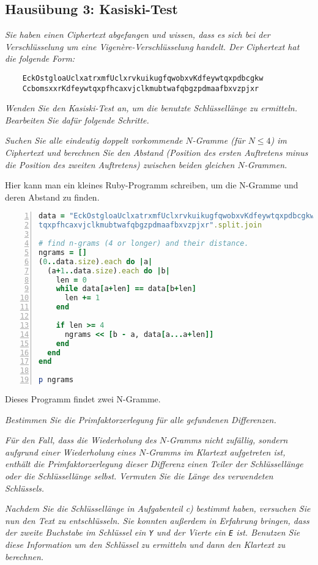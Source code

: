 \documentclass[
  ngerman,
  DIV=12
]{scrartcl}
\begin{document}
\subsection*{Hausübung 3: Kasiski-Test}

\emph{Sie haben einen Ciphertext abgefangen und wissen, dass es sich bei der Verschlüsselung um eine Vigenère-Verschlüsselung handelt. Der Ciphertext hat die folgende Form:}
\begin{verbatim}
    EckOstgloaUclxatrxmfUclxrvkuikugfqwobxvKdfeywtqxpdbcgkw
    CcbomsxxrKdfeywtqxpfhcaxvjclkmubtwafqbgzpdmaafbxvzpjxr
\end{verbatim}
\emph{Wenden Sie den Kasiski-Test an, um die benutzte Schlüssellänge zu ermitteln. Bearbeiten Sie dafür folgende Schritte.}

\medskip\noindent
\emph{Suchen Sie alle eindeutig doppelt vorkommende $N$-Gramme (für $N \leq 4$) im Ciphertext und berechnen Sie den Abstand (Position des ersten Auftretens minus die Position des zweiten Auftretens) zwischen beiden gleichen $N$-Grammen.}

\medskip\noindent
Hier kann man ein kleines Ruby-Programm schreiben, um die N-Gramme und deren Abstand zu finden.
\begin{lstlisting}[language=ruby,numbers=left]
data = "EckOstgloaUclxatrxmfUclxrvkuikugfqwobxvKdfeywtqxpdbcgkwCcbomsxxrKdfeyw
tqxpfhcaxvjclkmubtwafqbgzpdmaafbxvzpjxr".split.join

# find n-grams (4 or longer) and their distance. 
ngrams = []
(0..data.size).each do |a|
  (a+1..data.size).each do |b|
    len = 0
    while data[a+len] == data[b+len]
      len += 1
    end

    if len >= 4
      ngrams << [b - a, data[a...a+len]]
    end
  end
end

p ngrams  
\end{lstlisting}
Dieses Programm findet zwei N-Gramme.

\bigskip\noindent
\emph{Bestimmen Sie die Primfaktorzerlegung für alle gefundenen Differenzen.}

\bigskip\noindent
\emph{Für den Fall, dass die Wiederholung des $N$-Gramms nicht zufällig, sondern aufgrund einer Wiederholung eines $N$-Gramms im Klartext aufgetreten ist, enthält die Primfaktorzerlegung dieser Differenz einen Teiler der Schlüssellänge oder die Schlüssellänge selbst. Vermuten Sie die Länge des verwendeten Schlüssels.}

\bigskip\noindent
\emph{Nachdem Sie die Schlüssellänge in Aufgabenteil c) bestimmt haben, versuchen Sie nun den Text zu entschlüsseln. Sie konnten außerdem in Erfahrung bringen, dass der zweite Buchstabe im Schlüssel ein \texttt{Y} und der Vierte ein \texttt{E} ist. Benutzen Sie diese Information um den Schlüssel zu ermitteln und dann den Klartext zu berechnen.}




\end{document}

